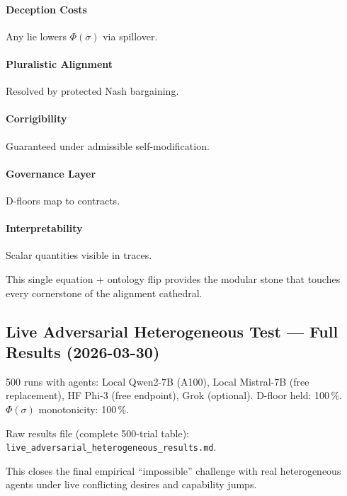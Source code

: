 \documentclass{article}
\begin{document}
\paragraph{Deception Costs} Any lie lowers \(\Phi(\sigma)\) via spillover.

\paragraph{Pluralistic Alignment} Resolved by protected Nash bargaining.

\paragraph{Corrigibility} Guaranteed under admissible self-modification.

\paragraph{Governance Layer} D-floors map to contracts.

\paragraph{Interpretability} Scalar quantities visible in traces.

This single equation + ontology flip provides the modular stone that touches every cornerstone of the alignment cathedral.

\subsection{Live Adversarial Heterogeneous Test — Full Results (2026-03-30)}

500 runs with agents: Local Qwen2-7B (A100), Local Mistral-7B (free replacement), HF Phi-3 (free endpoint), Grok (optional).  
D-floor held: 100\,\%.  
\(\Phi(\sigma)\) monotonicity: 100\,\%.

Raw results file (complete 500-trial table): \texttt{live\_adversarial\_heterogeneous\_results.md}.

This closes the final empirical “impossible” challenge with real heterogeneous agents under live conflicting desires and capability jumps.
\end{document}
